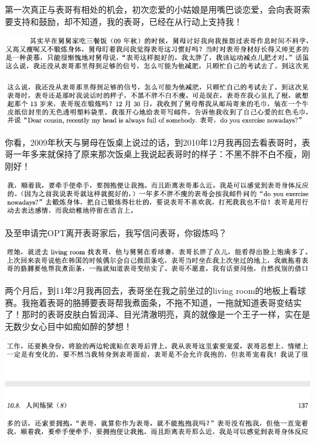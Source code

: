 \documentclass[9pt, b5paper]{article}
\begin{document}
第一次真正与表哥有相处的机会，初次恋爱的小姑娘是用嘴巴谈恋爱，会向表哥索要支持和鼓励，却不知道，我的表哥，已经在从行动上支持我！

\begin{center}
\includegraphics[width=.9\linewidth]{./pic/p1p45-4.png}
\end{center}

\begin{center}
\includegraphics[width=.9\linewidth]{./pic/p1p45-5.png}
\end{center}

你看，2009年秋天与舅母在饭桌上说过的话，到2010年12月我再回去看表哥时，表哥一年多来就保持了原来那次饭桌上我说起表哥时的样子：不黑不胖不白不瘦，刚刚好！

\begin{center}
\includegraphics[width=.9\linewidth]{./pic/p1p137-4.png}
\end{center}

及至申请完OPT离开表哥家后，我写信问表哥，你锻炼吗？

\begin{center}
\includegraphics[width=.9\linewidth]{./pic/p1p49-5.png}
\end{center}

两个月后，到11年2月我再回去，表哥坐在我之前坐过的living room的地板上看球赛。我拖着表哥的胳膊要表哥帮我煮面条，不拖不知道，一拖就知道表哥变结实了！那时的表哥皮肤白皙润泽、目光清澈明亮，真的就像是一个王子一样，实在是无数少女心目中如痴如醉的梦想！

\begin{center}
\includegraphics[width=.9\linewidth]{./pic/p1p137-5.png}
\end{center}
\end{document}
